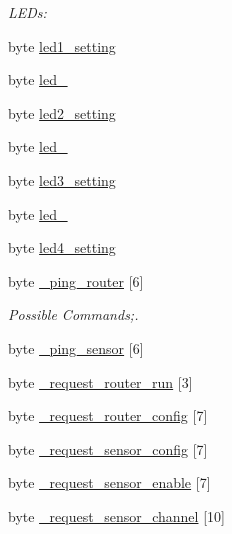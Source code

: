 \begin{DoxyCompactItemize}
\begin{DoxyCompactList}\small\item\em L\-E\-Ds\-: \end{DoxyCompactList}\item 
byte \hyperlink{struct_n_v_r_a_m_1_1nv__data__t_a76597a384133a0af3bae21b5caa4f7df}{led1\-\_\-setting}
\item 
byte \hyperlink{struct_n_v_r_a_m_1_1nv__data__t_ac0b273dc325fd6318bc0a44ce6c58137}{led\-\_}
\item 
byte \hyperlink{struct_n_v_r_a_m_1_1nv__data__t_aeed970dbf67dc4d1de4424cc78747d2a}{led2\-\_\-setting}
\item 
byte \hyperlink{struct_n_v_r_a_m_1_1nv__data__t_a0408ab135e8e2618fce88c4185f84751}{led\-\_}
\item 
byte \hyperlink{struct_n_v_r_a_m_1_1nv__data__t_af3ed0f3ac41ee1c76acf247be0db43cf}{led3\-\_\-setting}
\item 
byte \hyperlink{struct_n_v_r_a_m_1_1nv__data__t_a4193a514c5d1d34274d3edb0aa6dfb42}{led\-\_}
\item 
byte \hyperlink{struct_n_v_r_a_m_1_1nv__data__t_a2e28d27bfb09a3b9c37e44df93fc136f}{led4\-\_\-setting}
\item 
byte \hyperlink{struct_n_v_r_a_m_1_1nv__data__t_a5bc314391f400619fceb6d810c561487}{\-\_\-ping\-\_\-router} \mbox{[}6\mbox{]}
\begin{DoxyCompactList}\small\item\em Possible Commands;. \end{DoxyCompactList}\item 
byte \hyperlink{struct_n_v_r_a_m_1_1nv__data__t_ab3ad2cdee9bcdc40a3341d74411ae21b}{\-\_\-ping\-\_\-sensor} \mbox{[}6\mbox{]}
\item 
byte \hyperlink{struct_n_v_r_a_m_1_1nv__data__t_a1bffd1976aa27e38fc7d66c79a65ab0d}{\-\_\-request\-\_\-router\-\_\-run} \mbox{[}3\mbox{]}
\item 
byte \hyperlink{struct_n_v_r_a_m_1_1nv__data__t_aa92ac22232bd35fd609a9bc765b93baa}{\-\_\-request\-\_\-router\-\_\-config} \mbox{[}7\mbox{]}
\item 
byte \hyperlink{struct_n_v_r_a_m_1_1nv__data__t_a1738b0bfc12cfaa50156d10f87c1b5ad}{\-\_\-request\-\_\-sensor\-\_\-config} \mbox{[}7\mbox{]}
\item 
byte \hyperlink{struct_n_v_r_a_m_1_1nv__data__t_a7a4f7002e162d6e8a4f56db4dd1b4793}{\-\_\-request\-\_\-sensor\-\_\-enable} \mbox{[}7\mbox{]}
\item 
byte \hyperlink{struct_n_v_r_a_m_1_1nv__data__t_a513b7debd8817f114a240e50bfd5236a}{\-\_\-request\-\_\-sensor\-\_\-channel} \mbox{[}10\mbox{]}

\end{DoxyCompactItemize}
